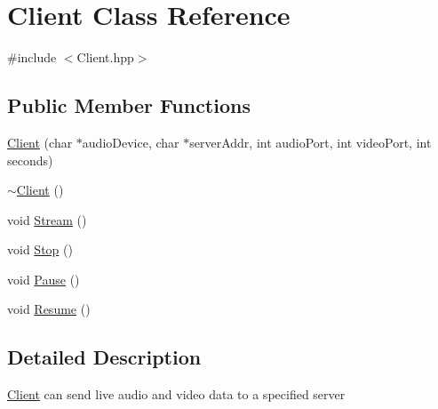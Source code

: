 \hypertarget{classClient}{\section{Client Class Reference}
\label{classClient}
}


{\ttfamily \#include $<$Client.\+hpp$>$}

\subsection*{Public Member Functions}
\begin{DoxyCompactItemize}
\item 
\hyperlink{classClient_aae8438800e1a1a3e4af897d63f93dc21}{Client} (char $\ast$audio\+Device, char $\ast$server\+Addr, int audio\+Port, int video\+Port, int seconds)
\item 
\hyperlink{classClient_a840e519ca781888cbd54181572ebe3a7}{$\sim$\+Client} ()
\item 
void \hyperlink{classClient_a6f12baa525b0c93000569172ff6ae3fa}{Stream} ()
\item 
void \hyperlink{classClient_a1dd85fbf24f35fd0c08608b34f54e4b2}{Stop} ()
\item 
void \hyperlink{classClient_ad7191a4668bb5cee1c9475ff6c8b60d8}{Pause} ()
\item 
void \hyperlink{classClient_a0d0f4a1317a31aca618d318c49648dd4}{Resume} ()
\end{DoxyCompactItemize}


\subsection{Detailed Description}
\hyperlink{classClient}{Client} can send live audio and video data to a specified server 

